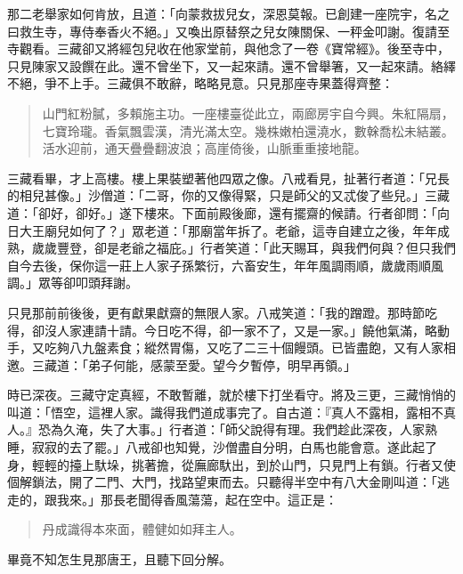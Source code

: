 那二老舉家如何肯放，且道：「向蒙救拔兒女，深恩莫報。已創建一座院宇，名之曰救生寺，專侍奉香火不絕。」又喚出原替祭之兒女陳關保、一秤金叩謝。復請至寺觀看。三藏卻又將經包兒收在他家堂前，與他念了一卷《寶常經》。後至寺中，只見陳家又設饌在此。還不曾坐下，又一起來請。還不曾舉箸，又一起來請。絡繹不絕，爭不上手。三藏俱不敢辭，略略見意。只見那座寺果蓋得齊整：
\begin{quote}
山門紅粉膩，多賴施主功。一座樓臺從此立，兩廊房宇自今興。朱紅隔扇，七寶玲瓏。香氣飄雲漢，清光滿太空。幾株嫩柏還澆水，數榦喬松未結叢。活水迎前，通天疊疊翻波浪；高崖倚後，山脈重重接地龍。
\end{quote}

三藏看畢，才上高樓。樓上果裝塑著他四眾之像。八戒看見，扯著行者道：「兄長的相兒甚像。」沙僧道：「二哥，你的又像得緊，只是師父的又忒俊了些兒。」三藏道：「卻好，卻好。」遂下樓來。下面前殿後廊，還有擺齋的候請。行者卻問：「向日大王廟兒如何了？」眾老道：「那廟當年拆了。老爺，這寺自建立之後，年年成熟，歲歲豐登，卻是老爺之福庇。」行者笑道：「此天賜耳，與我們何與？但只我們自今去後，保你這一莊上人家子孫繁衍，六畜安生，年年風調雨順，歲歲雨順風調。」眾等卻叩頭拜謝。

只見那前前後後，更有獻果獻齋的無限人家。八戒笑道：「我的蹭蹬。那時節吃得，卻沒人家連請十請。今日吃不得，卻一家不了，又是一家。」饒他氣滿，略動手，又吃夠八九盤素食；縱然胃傷，又吃了二三十個饅頭。已皆盡飽，又有人家相邀。三藏道：「弟子何能，感蒙至愛。望今夕暫停，明早再領。」

時已深夜。三藏守定真經，不敢暫離，就於樓下打坐看守。將及三更，三藏悄悄的叫道：「悟空，這裡人家。識得我們道成事完了。自古道：『真人不露相，露相不真人。』恐為久淹，失了大事。」行者道：「師父說得有理。我們趁此深夜，人家熟睡，寂寂的去了罷。」八戒卻也知覺，沙僧盡自分明，白馬也能會意。遂此起了身，輕輕的擡上馱垛，挑著擔，從廡廊馱出，到於山門，只見門上有鎖。行者又使個解鎖法，開了二門、大門，找路望東而去。只聽得半空中有八大金剛叫道：「逃走的，跟我來。」那長老聞得香風蕩蕩，起在空中。這正是：
\begin{quote}
丹成識得本來面，體健如如拜主人。
\end{quote}

畢竟不知怎生見那唐王，且聽下回分解。
